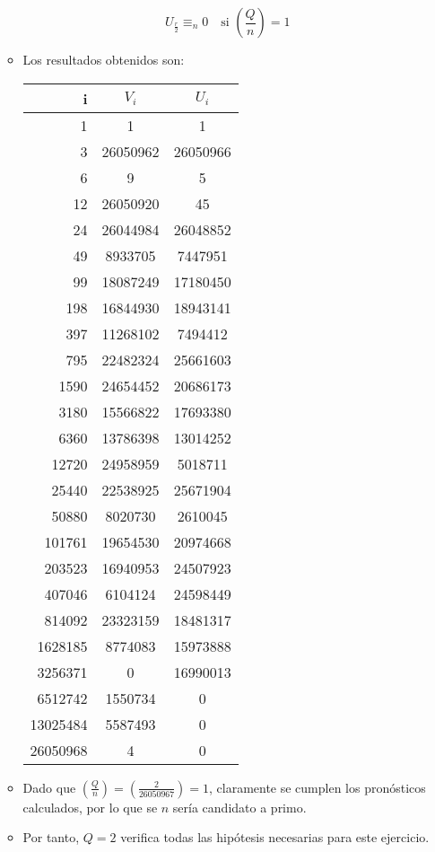 \begin{enumerate}
\begin{itemize}
			
			$$U_{\frac{r}{2}} \equiv_n 0 \quad \text{si } \displaystyle \left(\frac{Q}{n}\right) = 1$$
			
			\item Los resultados obtenidos son:
			\begin{center}
				\begin{tabular}{ | r | c | c |}
					\hline
					i        & $V_i$    & $U_i$ \\
					\hline
					1        & 1        & 1 \\
					3        & 26050962 & 26050966 \\
					6        & 9        & 5 \\
					12       & 26050920 & 45 \\
					24       & 26044984 & 26048852 \\
					49       & 8933705  & 7447951 \\
					99       & 18087249 & 17180450 \\
					198      & 16844930 & 18943141 \\
					397      & 11268102 & 7494412 \\
					795      & 22482324 & 25661603 \\
					1590     & 24654452 & 20686173 \\
					3180     & 15566822 & 17693380 \\
					6360     & 13786398 & 13014252 \\
					12720    & 24958959 & 5018711 \\
					25440    & 22538925 & 25671904 \\
					50880    & 8020730  & 2610045 \\
					101761   & 19654530 & 20974668 \\
					203523   & 16940953 & 24507923 \\
					407046   & 6104124  & 24598449 \\
					814092   & 23323159 & 18481317 \\
					1628185  & 8774083  & 15973888 \\
					3256371  & 0        & 16990013 \\
					6512742  & 1550734  & 0 \\
					13025484 & 5587493  & 0 \\
					26050968 & 4        & 0 \\
					\hline
				\end{tabular}
			\end{center}
					
			\item Dado que $\displaystyle \left(\frac{Q}{n}\right) = \left(\frac{2}{26050967} \right)= 1$, claramente
			se cumplen los pronósticos calculados, por lo que se $n$ sería candidato a primo.
			
			\item Por tanto, $Q = 2$ verifica todas las hipótesis necesarias para este ejercicio.
		\end{itemize}
	\end{enumerate}
